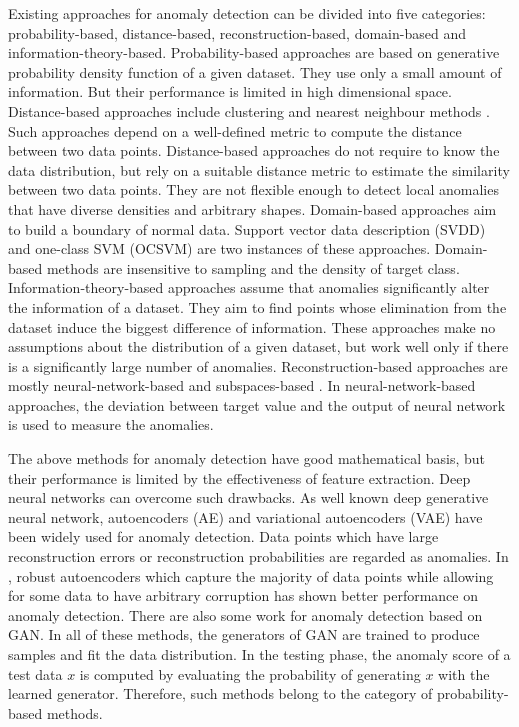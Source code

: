 \documentclass[a4paper,conference]{IEEEtran}
\begin{document}
Existing approaches for anomaly detection can be divided into five categories: probability-based, distance-based, reconstruction-based, domain-based and information-theory-based. Probability-based approaches \cite{chatzigiannakis2006hierarchical}\cite{erdogmus2004multivariate} are based on generative probability density function of a given dataset.  They use only a small amount of information. But their performance  is limited in high dimensional space.
Distance-based approaches include clustering \cite{angelov2004approach}\cite{BDLZ2014} and nearest neighbour methods \cite{stranjak2008multi}\cite{DU2016115}. Such approaches depend on a well-defined metric to compute the distance between two data points. Distance-based approaches do not require to know the data distribution, but rely on a suitable distance metric to estimate the similarity between two data points. They are not flexible enough to detect local anomalies that have diverse densities and arbitrary shapes.
Domain-based  approaches aim to build a boundary of normal data. Support vector data description (SVDD) \cite{campbell2001linear} and one-class SVM (OCSVM) \cite{heller2003one} are two instances of these approaches. Domain-based methods are insensitive to sampling and the density of target class. Information-theory-based approaches assume that anomalies significantly alter the information of a dataset.  They aim to find points whose elimination from the dataset induce the biggest difference of information. These approaches  make no assumptions about the distribution of a given dataset, but work well only if there is a significantly large number of anomalies. Reconstruction-based approaches are mostly neural-network-based  \cite{augusteijn2002neural} and subspaces-based \cite{mcbain2011feature}. In neural-network-based approaches, the deviation between  target value and the output of  neural network is used to measure the anomalies.


The above methods for anomaly detection have  good  mathematical basis, but their performance is limited by the effectiveness of feature extraction. Deep neural networks can overcome such drawbacks.  As well known deep generative neural network, autoencoders (AE) and variational autoencoders (VAE) have been widely used for anomaly detection. Data points which have large reconstruction errors or reconstruction probabilities are regarded as anomalies. In \cite{chalapathy2017robust}, robust autoencoders  which capture the majority of data points while allowing for some data to have arbitrary corruption has shown better performance on anomaly detection.   There are also some work \cite{principi2017acoustic}\cite{ravanbakhsh2017abnormal}\cite{schlegl2017unsupervised} for anomaly detection based on GAN. In all of these methods, the generators of GAN are trained to produce samples and fit the data distribution. In the testing phase, the anomaly score of a test data $x$ is computed by evaluating the probability of generating $x$ with the learned generator. Therefore, such methods belong to the category of probability-based methods.
\end{document}
